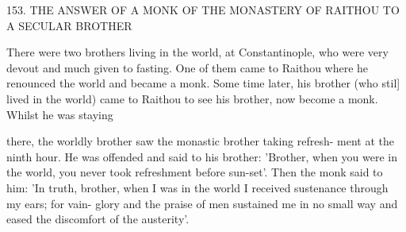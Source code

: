 153.
THE ANSWER OF A MONK OF THE MONASTERY
OF RAITHOU TO A SECULAR BROTHER

There were two brothers living in the world, at Constantinople, who
were very devout and much given to fasting.
One of them came to
Raithou where he renounced the world and became a monk.
Some
time later, his brother (who stil] lived in the world) came to Raithou
to see his brother, now become a monk.
Whilst he was staying

there, the worldly brother saw the monastic brother taking refresh-
ment at the ninth hour.
He was offended and said to his brother:
'Brother, when you were in the world, you never took refreshment
before sun-set'.
Then the monk said to him: 'In truth, brother, when
I was in the world I received sustenance through my ears; for vain-
glory and the praise of men sustained me in no small way and eased
the discomfort of the austerity'.

